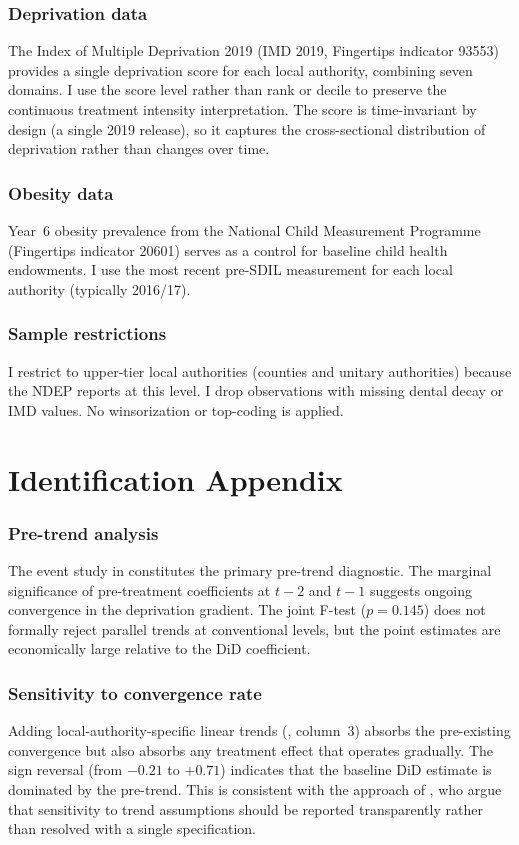 \documentclass[12pt]{article}
\begin{document}
\subsubsection*{Deprivation data} The Index of Multiple Deprivation 2019 (IMD 2019, Fingertips indicator 93553) provides a single deprivation score for each local authority, combining seven domains. I use the score level rather than rank or decile to preserve the continuous treatment intensity interpretation. The score is time-invariant by design (a single 2019 release), so it captures the cross-sectional distribution of deprivation rather than changes over time.

\subsubsection*{Obesity data} Year~6 obesity prevalence from the National Child Measurement Programme (Fingertips indicator 20601) serves as a control for baseline child health endowments. I use the most recent pre-SDIL measurement for each local authority (typically 2016/17).

\subsubsection*{Sample restrictions} I restrict to upper-tier local authorities (counties and unitary authorities) because the NDEP reports at this level. I drop observations with missing dental decay or IMD values. No winsorization or top-coding is applied.


\section{Identification Appendix}

\subsubsection*{Pre-trend analysis} The event study in  constitutes the primary pre-trend diagnostic. The marginal significance of pre-treatment coefficients at $t - 2$ and $t - 1$ suggests ongoing convergence in the deprivation gradient. The joint F-test ($p = 0.145$) does not formally reject parallel trends at conventional levels, but the point estimates are economically large relative to the DiD coefficient.

\subsubsection*{Sensitivity to convergence rate} Adding local-authority-specific linear trends (, column~3) absorbs the pre-existing convergence but also absorbs any treatment effect that operates gradually. The sign reversal (from $-0.21$ to $+0.71$) indicates that the baseline DiD estimate is dominated by the pre-trend. This is consistent with the approach of \citet{rambachan2023honest}, who argue that sensitivity to trend assumptions should be reported transparently rather than resolved with a single specification.
\end{document}
